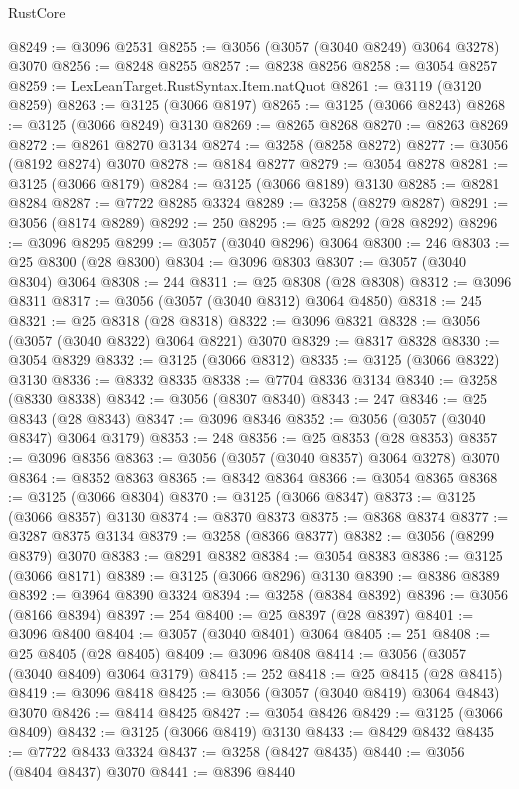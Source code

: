 \begin{lexlean}{RustCore}
\begin{coremodule}
@8249 := @3096 @2531
@8255 := @3056 (@3057 (@3040 @8249) @3064 @3278) @3070
@8256 := @8248 @8255
@8257 := @8238 @8256
@8258 := @3054 @8257
@8259 := LexLeanTarget.RustSyntax.Item.natQuot
@8261 := @3119 (@3120 @8259)
@8263 := @3125 (@3066 @8197)
@8265 := @3125 (@3066 @8243)
@8268 := @3125 (@3066 @8249) @3130
@8269 := @8265 @8268
@8270 := @8263 @8269
@8272 := @8261 @8270 @3134
@8274 := @3258 (@8258 @8272)
@8277 := @3056 (@8192 @8274) @3070
@8278 := @8184 @8277
@8279 := @3054 @8278
@8281 := @3125 (@3066 @8179)
@8284 := @3125 (@3066 @8189) @3130
@8285 := @8281 @8284
@8287 := @7722 @8285 @3324
@8289 := @3258 (@8279 @8287)
@8291 := @3056 (@8174 @8289)
@8292 := 250
@8295 := @25 @8292 (@28 @8292)
@8296 := @3096 @8295
@8299 := @3057 (@3040 @8296) @3064
@8300 := 246
@8303 := @25 @8300 (@28 @8300)
@8304 := @3096 @8303
@8307 := @3057 (@3040 @8304) @3064
@8308 := 244
@8311 := @25 @8308 (@28 @8308)
@8312 := @3096 @8311
@8317 := @3056 (@3057 (@3040 @8312) @3064 @4850)
@8318 := 245
@8321 := @25 @8318 (@28 @8318)
@8322 := @3096 @8321
@8328 := @3056 (@3057 (@3040 @8322) @3064 @8221) @3070
@8329 := @8317 @8328
@8330 := @3054 @8329
@8332 := @3125 (@3066 @8312)
@8335 := @3125 (@3066 @8322) @3130
@8336 := @8332 @8335
@8338 := @7704 @8336 @3134
@8340 := @3258 (@8330 @8338)
@8342 := @3056 (@8307 @8340)
@8343 := 247
@8346 := @25 @8343 (@28 @8343)
@8347 := @3096 @8346
@8352 := @3056 (@3057 (@3040 @8347) @3064 @3179)
@8353 := 248
@8356 := @25 @8353 (@28 @8353)
@8357 := @3096 @8356
@8363 := @3056 (@3057 (@3040 @8357) @3064 @3278) @3070
@8364 := @8352 @8363
@8365 := @8342 @8364
@8366 := @3054 @8365
@8368 := @3125 (@3066 @8304)
@8370 := @3125 (@3066 @8347)
@8373 := @3125 (@3066 @8357) @3130
@8374 := @8370 @8373
@8375 := @8368 @8374
@8377 := @3287 @8375 @3134
@8379 := @3258 (@8366 @8377)
@8382 := @3056 (@8299 @8379) @3070
@8383 := @8291 @8382
@8384 := @3054 @8383
@8386 := @3125 (@3066 @8171)
@8389 := @3125 (@3066 @8296) @3130
@8390 := @8386 @8389
@8392 := @3964 @8390 @3324
@8394 := @3258 (@8384 @8392)
@8396 := @3056 (@8166 @8394)
@8397 := 254
@8400 := @25 @8397 (@28 @8397)
@8401 := @3096 @8400
@8404 := @3057 (@3040 @8401) @3064
@8405 := 251
@8408 := @25 @8405 (@28 @8405)
@8409 := @3096 @8408
@8414 := @3056 (@3057 (@3040 @8409) @3064 @3179)
@8415 := 252
@8418 := @25 @8415 (@28 @8415)
@8419 := @3096 @8418
@8425 := @3056 (@3057 (@3040 @8419) @3064 @4843) @3070
@8426 := @8414 @8425
@8427 := @3054 @8426
@8429 := @3125 (@3066 @8409)
@8432 := @3125 (@3066 @8419) @3130
@8433 := @8429 @8432
@8435 := @7722 @8433 @3324
@8437 := @3258 (@8427 @8435)
@8440 := @3056 (@8404 @8437) @3070
@8441 := @8396 @8440

\end{coremodule}
\end{lexlean}
